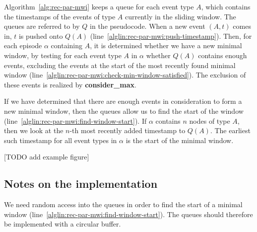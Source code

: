 Algorithm~\ref{alg:rec-par-mwi} keeps a queue for each event type $ A $, which contains the timestamps of the events of type $ A $ currently in the sliding window. The queues are referred to by $ Q $ in the pseudocode. When a new event $ (A, t) $ comes in, $ t $ is pushed onto $ Q(A) $ (line~\ref{alglin:rec-par-mwi:push-timestamp}). Then, for each episode $ \alpha $ containing $ A $, it is determined whether we have a new minimal window, by testing for each event type $ A $ in $ \alpha $ whether $ Q(A) $ contains enough events, excluding the events at the start of the most recently found minimal window (line~\ref{alglin:rec-par-mwi:check-min-window-satisfied}). The exclusion of these events is realized by \textbf{consider\_max}.

If we have determined that there are enough events in consideration to form a new minimal window, then the queues allow us to find the start of the window (line~\ref{alglin:rec-par-mwi:find-window-start}). If $ \alpha $ contains $ n $ nodes of type $ A $, then we look at the $ n $-th most recently added timestamp to $ Q(A) $. The earliest such timestamp for all event types in $ \alpha $ is the start of the minimal window.


[TODO add example figure]

\iffalse
\begin{figure}
\centering

\begin{tikzpicture}

\sequencetickmarks{7}{0}{0}
\sequenceeventtypes{0}{1em}{1}{1/a,2/b,3/a,4/b,5/c,6/b,7/a}

\windowthingy{(0,-5pt)}{2}
\windowthingy{(0.5,-10pt)}{2}
\windowthingy{(1,-5pt)}{2}
\windowthingy{(2.5,-5pt)}{2}

\end{tikzpicture}

\caption{All of the minimal windows of $ \{ a, b \} $ in the sequence.}
\label{fig:rec-par-mwi-example}
\end{figure}
\fi

\subsection{Notes on the implementation}

We need random access into the queues in order to find the start of a minimal window (line~\ref{alglin:rec-par-mwi:find-window-start}). The queues should therefore be implemented with a circular buffer.


